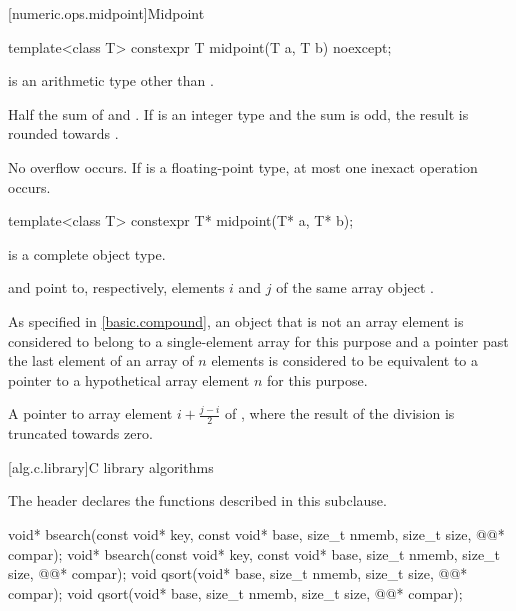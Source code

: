 [numeric.ops.midpoint]{Midpoint}

%
\begin{itemdecl}
template<class T>
  constexpr T midpoint(T a, T b) noexcept;
\end{itemdecl}
\begin{itemdescr}
\pnum
\constraints
{} is an arithmetic type other than .

\pnum
\returns
Half the sum of  and .
If  is an integer type and the sum is odd,
the result is rounded towards .

\pnum
\remarks
No overflow occurs.
If  is a floating-point type, at most one inexact operation occurs.
\end{itemdescr}

%
\begin{itemdecl}
template<class T>
  constexpr T* midpoint(T* a, T* b);
\end{itemdecl}
\begin{itemdescr}
\pnum
\constraints
{} is a complete object type.

\pnum
\expects
{} and  point to, respectively,
elements $i$ and $j$ of the same array object .
\begin{note}
As specified in \ref{basic.compound},
an object that is not an array element
is considered to belong to a single-element array for this purpose and
a pointer past the last element of an array of $n$ elements
is considered to be equivalent to a pointer
to a hypothetical array element $n$ for this purpose.
\end{note}

\pnum
\returns
A pointer to array element $i+\frac{j-i}{2}$ of ,
where the result of the division is truncated towards zero.
\end{itemdescr}

[alg.c.library]{C library algorithms}

\pnum
\begin{note}
The header 
declares the functions described in this subclause.
\end{note}

%
%
\begin{itemdecl}
void* bsearch(const void* key, const void* base, size_t nmemb, size_t size,
              @@* compar);
void* bsearch(const void* key, const void* base, size_t nmemb, size_t size,
              @@* compar);
void qsort(void* base, size_t nmemb, size_t size, @@* compar);
void qsort(void* base, size_t nmemb, size_t size, @@* compar);
\end{itemdecl}

